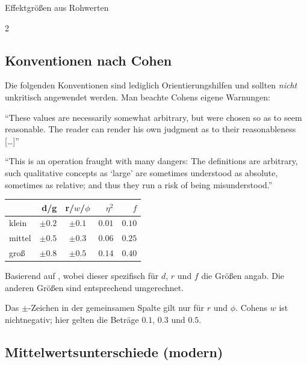 \begin{formulaBox}{Effektgrößen aus Rohwerten}{}
\begin{multicols}{2}

\subsection*{Konventionen nach Cohen}
Die folgenden Konventionen sind lediglich Orientierungshilfen und sollten \emph{nicht} unkritisch angewendet werden. Man beachte Cohens eigene Warnungen:
\vspace{2mm}

\enquote{These values are necessarily somewhat arbitrary, but were chosen so as to seem reasonable. The reader can render his own judgment as to their reasonableness [\ldots]} \parencite[][S. 146]{cohen1962}
\vspace{2mm}

\enquote{This is an operation fraught with many dangers: The definitions are arbitrary, such qualitative concepts as \enquote{large} are sometimes understood as absolute, sometimes as relative; and thus they run a risk of being misunderstood.} \parencite[][S. 12]{cohen1988}
\vspace{2mm}

\begin{tabular}{lcccc}
    \toprule
    & \multicolumn{1}{r}{d/g} & \multicolumn{1}{r}{r/$w$/$\phi$} & \multicolumn{1}{r}{$\eta^2$} & \multicolumn{1}{r}{$f$} \\
    \midrule
    klein & $\pm 0.2$ & $\pm 0.1$ & $0.01$ & $0.10$ \\
    mittel & $\pm 0.5$ & $\pm 0.3$ & $0.06$ & $0.25$ \\
    groß & $\pm 0.8$ & $\pm 0.5$ & $0.14$ & $0.40$ \\
    \bottomrule
\end{tabular}

\vspace{2mm}
Basierend auf \textcite{cohen1988}, wobei dieser spezifisch für $d$, $r$ und $f$ die Größen angab. Die anderen Größen sind entsprechend umgerechnet.
\par Das $\pm$-Zeichen in der gemeinsamen Spalte gilt nur für $r$ und $\phi$. Cohens $w$ ist nichtnegativ; hier gelten die Beträge $0.1$, $0.3$ und $0.5$.


\subsection*{Mittelwertsunterschiede (modern)}


\end{multicols}
\end{formulaBox}
